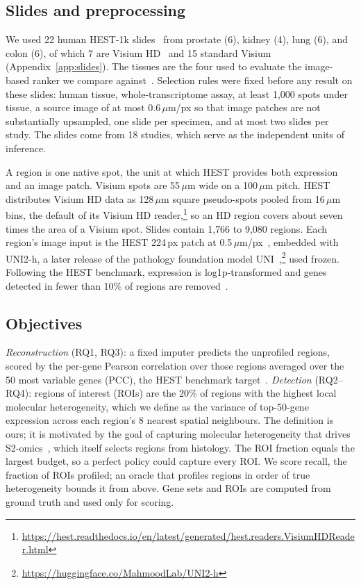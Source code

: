 \documentclass[10pt]{article}
\begin{document}
\subsection{Slides and preprocessing}
We used 22 human HEST-1k slides~\citep{jaume2024hest} from prostate (6), kidney (4), lung (6), and colon (6), of
which 7 are Visium HD~\citep{oliveira2025visiumhd} and 15 standard Visium~\citep{stahl2016visualization}
(Appendix~\ref{app:slides}). The tissues are the four used to evaluate the image-based ranker we compare
against~\citep{spatialfinder2026}. Selection rules were fixed before any result on these slides: human tissue,
whole-transcriptome assay, at least 1{,}000 spots under tissue, a source image of at most 0.6\,$\mu$m/px so that
image patches are not substantially upsampled, one slide per specimen, and at most two slides per study. The
slides come from 18 studies, which serve as the independent units of inference.

A region is one native spot, the unit at which HEST provides both expression and an image patch. Visium spots are
55\,$\mu$m wide on a 100\,$\mu$m pitch. HEST distributes Visium HD data as 128\,$\mu$m square pseudo-spots pooled
from 16\,$\mu$m bins, the default of its Visium HD reader,\footnote{\url{https://hest.readthedocs.io/en/latest/generated/hest.readers.VisiumHDReader.html}}
so an HD region covers about seven times the area of a Visium spot. Slides contain 1{,}766 to 9{,}080 regions. Each region's image input is the HEST
224\,px patch at 0.5\,$\mu$m/px~\citep{jaume2024hest}, embedded with UNI2-h, a later release of the pathology
foundation model UNI~\citep{chen2024uni},\footnote{\url{https://huggingface.co/MahmoodLab/UNI2-h}} used frozen.
Following the HEST benchmark, expression is log1p-transformed and genes detected in fewer than 10\% of regions are
removed~\citep{jaume2024hest}.

\subsection{Objectives}
\emph{Reconstruction} (RQ1, RQ3): a fixed imputer predicts the unprofiled regions, scored by the per-gene Pearson
correlation over those regions averaged over the 50 most variable genes (PCC), the HEST benchmark
target~\citep{jaume2024hest}. \emph{Detection} (RQ2--RQ4): regions of interest (ROIs) are the 20\% of regions with
the highest local molecular heterogeneity, which we define as the variance of top-50-gene expression across each
region's 8 nearest spatial neighbours. The definition is ours; it is motivated by the goal of capturing molecular
heterogeneity that drives S2-omics~\citep{yuan2025s2omics}, which itself selects regions from histology. The ROI
fraction equals
the largest budget, so a perfect policy could capture every ROI. We score recall, the fraction of ROIs profiled;
an oracle that profiles regions in order of true heterogeneity bounds it from above.
Gene sets and ROIs are computed from ground truth and used only for scoring.
\end{document}
